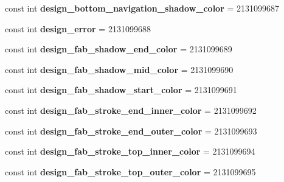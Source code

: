 \begin{DoxyCompactItemize}
const int {\bfseries design\+\_\+bottom\+\_\+navigation\+\_\+shadow\+\_\+color} = 2131099687
\item 
\mbox{\label{classst_delivery_1_1_resource_1_1_color_ae93bed669982851b1ca11ff92d8c8e6f}} 
const int {\bfseries design\+\_\+error} = 2131099688
\item 
\mbox{\label{classst_delivery_1_1_resource_1_1_color_a74903f1ad500a9b358096ab81d60a560}} 
const int {\bfseries design\+\_\+fab\+\_\+shadow\+\_\+end\+\_\+color} = 2131099689
\item 
\mbox{\label{classst_delivery_1_1_resource_1_1_color_a1415576330598ce34ff0d7b253894ac1}} 
const int {\bfseries design\+\_\+fab\+\_\+shadow\+\_\+mid\+\_\+color} = 2131099690
\item 
\mbox{\label{classst_delivery_1_1_resource_1_1_color_a1acdea353231d026a866b854c9f4ea66}} 
const int {\bfseries design\+\_\+fab\+\_\+shadow\+\_\+start\+\_\+color} = 2131099691
\item 
\mbox{\label{classst_delivery_1_1_resource_1_1_color_af1ad5cca3ef6573c89e1ce9b7b3004f4}} 
const int {\bfseries design\+\_\+fab\+\_\+stroke\+\_\+end\+\_\+inner\+\_\+color} = 2131099692
\item 
\mbox{\label{classst_delivery_1_1_resource_1_1_color_a78a4ea6c1717946935a7da7cc170b49e}} 
const int {\bfseries design\+\_\+fab\+\_\+stroke\+\_\+end\+\_\+outer\+\_\+color} = 2131099693
\item 
\mbox{\label{classst_delivery_1_1_resource_1_1_color_a86f45928f804bf6aa8953eeac3e3b378}} 
const int {\bfseries design\+\_\+fab\+\_\+stroke\+\_\+top\+\_\+inner\+\_\+color} = 2131099694
\item 
\mbox{\label{classst_delivery_1_1_resource_1_1_color_aa201f302c9fef34beb9e7034e4dc1629}} 
const int {\bfseries design\+\_\+fab\+\_\+stroke\+\_\+top\+\_\+outer\+\_\+color} = 2131099695
\item 

\end{DoxyCompactItemize}
